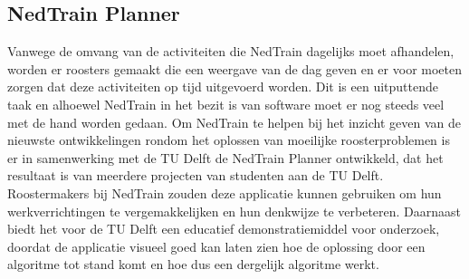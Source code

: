 \subsection{NedTrain Planner}
Vanwege de omvang van de activiteiten die NedTrain dagelijks moet afhandelen, worden er roosters gemaakt die een weergave van de dag geven en er voor moeten zorgen dat deze activiteiten op tijd uitgevoerd worden. Dit is een uitputtende taak en alhoewel NedTrain in het bezit is van software moet er nog steeds veel met de hand worden gedaan. Om NedTrain te helpen bij het inzicht geven van de nieuwste ontwikkelingen rondom het oplossen van moeilijke roosterproblemen is er in samenwerking met de TU Delft de NedTrain Planner ontwikkeld, dat het resultaat is van meerdere projecten van studenten aan de TU Delft. Roostermakers bij NedTrain zouden deze applicatie kunnen gebruiken om hun werkverrichtingen te vergemakkelijken en hun denkwijze te verbeteren. Daarnaast biedt het voor de TU Delft een educatief demonstratiemiddel voor onderzoek, doordat de applicatie visueel goed kan laten zien hoe de oplossing door een algoritme tot stand komt en hoe dus een dergelijk algoritme werkt.
